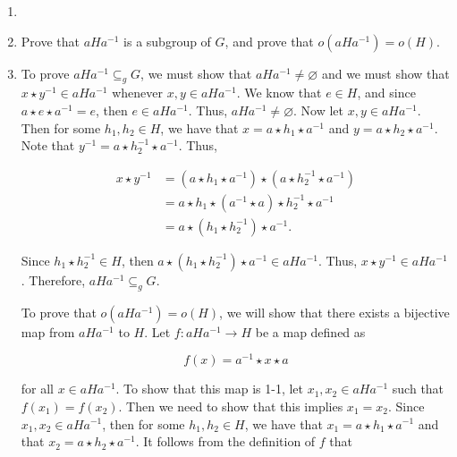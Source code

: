 \documentclass[12pt]{article}
\makeatletter
\theoremstyle{definition}
\theoremstyle{remark}
\renewenvironment{proof}[1][\proofname]{\par
  \pushQED{\qed}%
  \normalfont \topsep6\p@\@plus6\p@\relax
  \list{}{\leftmargin=0mm
          \rightmargin=4mm
          \settowidth{\itemindent}{\itshape#1}%
          \labelwidth=\itemindent
          \parsep=0pt \listparindent=\parindent 
  }
  \item[\hskip\labelsep
        \itshape
    #1\@addpunct{.}]\ignorespaces
}{%
  \popQED\endlist\@endpefalse
}
\let\oldproofname=\proofname
\renewcommand{\proofname}{\bf{\textit{\oldproofname}}}
\makeatother
\begin{document}
\begin{enumerate}[leftmargin=*]
\begin{enumerate}[label=(\alph*)]
\begin{proof}
                \end{proof}
            \item Prove that $aHa^{-1}$ is a subgroup of $G$, and prove that $o(aHa^{-1})=o(H)$.
                \begin{proof}
                    To prove $aHa^{-1}\subseteq_g G$, we must show that $aHa^{-1}\neq\varnothing$ and we must show that $x\star y^{-1}\in aHa^{-1}$ whenever $x,y\in aHa^{-1}$. We know that $e\in H$, and since $a\star e\star a^{-1}=e$, then $e\in aHa^{-1}$. Thus, $aHa^{-1}\neq\varnothing$. Now let $x,y\in aHa^{-1}$. Then for some $h_1,h_2\in H$, we have that $x=a\star h_1\star a^{-1}$ and $y=a\star h_2\star a^{-1}$. Note that $y^{-1}=a\star h_2^{-1}\star a^{-1}$. Thus, 
                    
                    \begin{equation*}
                        \begin{split}
                            x\star y^{-1} &= (a\star h_1\star a^{-1})\star(a\star h_2^{-1}\star a^{-1}) \\
                            &= a\star h_1\star(a^{-1}\star a)\star h_2^{-1}\star a^{-1} \\
                            &= a\star(h_1\star h_2^{-1})\star a^{-1}.
                        \end{split}
                    \end{equation*}
                    
                    Since $h_1\star h_2^{-1}\in H$, then $a\star(h_1\star h_2^{-1})\star a^{-1}\in aHa^{-1}$. Thus, $x\star y^{-1}\in aHa^{-1}$. Therefore, $aHa^{-1}\subseteq_g G$.\par\hspace{4mm} To prove that $o(aHa^{-1})=o(H)$, we will show that there exists a bijective map from $aHa^{-1}$ to $H$. Let $f\colon aHa^{-1}\rightarrow H$ be a map defined as 
                    
                    \begin{equation*}
                        f(x)=a^{-1}\star x\star a
                    \end{equation*}
                    
                    for all $x\in aHa^{-1}$. To show that this map is 1-1, let $x_1,x_2\in aHa^{-1}$ such that $f(x_1)=f(x_2)$. Then we need to show that this implies $x_1=x_2$. Since $x_1,x_2\in aHa^{-1}$, then for some $h_1,h_2\in H$, we have that $x_1=a\star h_1\star a^{-1}$ and that $x_2=a\star h_2\star a^{-1}$. It follows from the definition of $f$ that
                    

\end{proof}
\end{enumerate}
\end{enumerate}
\end{document}
